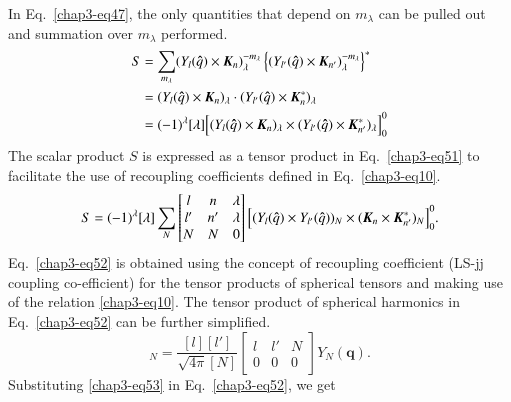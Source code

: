 In Eq.\ \eqref{chap3-eq47}, the only quantities that depend on $m_\lambda$ can be pulled out and summation over $m_\lambda$ performed.
\begin{align}
  S & = \sum_{m_\lambda} (Y_l ({\boldsymbol \hat{q}}) \times {\boldsymbol K}_n)_\lambda^{-m_\lambda}
  \left\{ (Y_{l'} ({\boldsymbol \hat{q}}) \times {\boldsymbol K}_{n'})_\lambda^{-m_\lambda}\right\}^\ast \notag \\
  & = (Y_l ({\boldsymbol \hat{q}}) \times {\boldsymbol K}_n)_\lambda \cdot (Y_{l'}({\boldsymbol \hat{q}}) \times {\boldsymbol K}_n^\ast)_\lambda \notag\\
  & = (-1)^\lambda [\lambda] \Bigl[(Y_l ({\boldsymbol \hat{q}}) \times  {\boldsymbol K}_n)_\lambda \times (Y_{l'}({\boldsymbol \hat{q}}) \times {\boldsymbol K}_{n'}^{\ast})_\lambda \Bigr]_0^0 \label{chap3-eq51}
\end{align}
The scalar product $S$ is expressed as a tensor product in Eq.\ \eqref{chap3-eq51} to facilitate the use of recoupling coefficients defined in Eq.\ \eqref{chap3-eq10}.
\begin{equation}
  S= (-1)^\lambda [\lambda] \sum_{N} \begin{bmatrix} l & n & \lambda \\ l' & n' & \lambda\\ N & N & 0\end{bmatrix}
    \Bigl[(Y_l ({\boldsymbol \hat{q}}) \times Y_{l'}({\boldsymbol \hat{q}}))_N \times ({\boldsymbol K}_n \times {\boldsymbol K}_{n'}^\ast)_N\Bigr]_0^0. \label{chap3-eq52}
\end{equation}
Eq.\ \eqref{chap3-eq52} is obtained using the concept of recoupling coefficient (LS-jj coupling co-efficient) for the tensor products of spherical tensors and making use of the relation \eqref{chap3-eq10}. The tensor product of spherical harmonics in Eq.\ \eqref{chap3-eq52} can be further simplified.
\begin{equation}
  [Y_l({\boldsymbol \hat{q}}) \times Y_{l'}({\boldsymbol \hat{q}})]_N = \frac{[l][l']}{\sqrt{4\pi}[N]}
  \begin{bmatrix}l & l' & N\\ 0 & 0 & 0  \end{bmatrix} Y_N ({\boldsymbol q}). \label{chap3-eq53}
\end{equation}
Substituting \eqref{chap3-eq53} in Eq.\ \eqref{chap3-eq52}, we get
